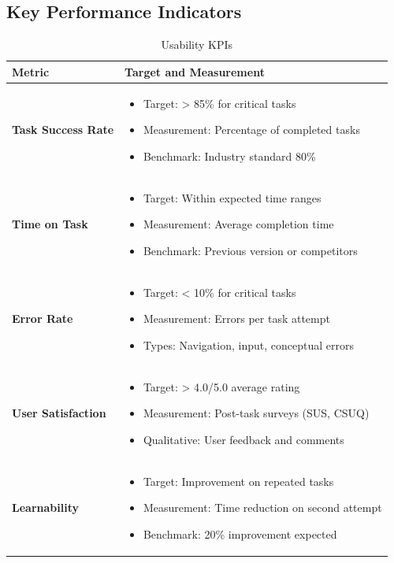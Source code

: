 \documentclass[12pt,a4paper]{article}
\begin{document}
\subsection{Key Performance Indicators}
\begin{longtable}{|p{4cm}|p{11cm}|}
\caption{Usability KPIs} \\
\hline
\rowcolor{lightgray}
\textbf{Metric} & \textbf{Target and Measurement} \\
\hline
\textbf{Task Success Rate} & 
\begin{itemize}[nosep]
    \item Target: > 85\% for critical tasks
    \item Measurement: Percentage of completed tasks
    \item Benchmark: Industry standard 80\%
\end{itemize} \\
\hline
\textbf{Time on Task} & 
\begin{itemize}[nosep]
    \item Target: Within expected time ranges
    \item Measurement: Average completion time
    \item Benchmark: Previous version or competitors
\end{itemize} \\
\hline
\textbf{Error Rate} & 
\begin{itemize}[nosep]
    \item Target: < 10\% for critical tasks
    \item Measurement: Errors per task attempt
    \item Types: Navigation, input, conceptual errors
\end{itemize} \\
\hline
\textbf{User Satisfaction} & 
\begin{itemize}[nosep]
    \item Target: > 4.0/5.0 average rating
    \item Measurement: Post-task surveys (SUS, CSUQ)
    \item Qualitative: User feedback and comments
\end{itemize} \\
\hline
\textbf{Learnability} & 
\begin{itemize}[nosep]
    \item Target: Improvement on repeated tasks
    \item Measurement: Time reduction on second attempt
    \item Benchmark: 20\% improvement expected
\end{itemize} \\
\hline
\end{longtable}
\end{document}
